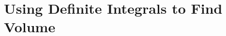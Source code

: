 \section{Using Definite Integrals to Find Volume} \label{S:6.1.Volume}



\newpage



\newpage



\newpage



\newpage

\clearpage
